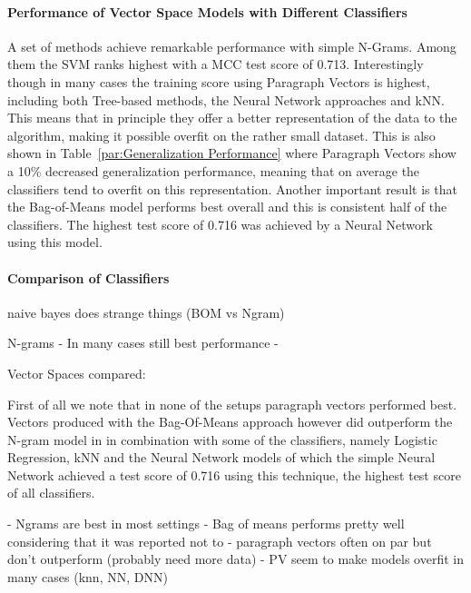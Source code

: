 \paragraph{Performance of Vector Space Models with Different Classifiers}
\label{par:Performance of Vector Space Models with Different Classifiers}

A set of methods achieve remarkable performance with simple N-Grams. Among them the SVM ranks highest with a \gls{MCC} test score of 0.713. Interestingly though in many cases the training score using Paragraph Vectors is highest, including both Tree-based methods, the Neural Network approaches and \gls{kNN}. This means that in principle they offer a better representation of the data to the algorithm, making it possible overfit on the rather small dataset. This is also shown in Table~\ref{par:Generalization Performance} where Paragraph Vectors show a 10\% decreased generalization performance, meaning that on average the classifiers tend to overfit on this representation.
Another important result is that the Bag-of-Means model performs best overall and this is consistent half of the classifiers. The highest test score of 0.716 was achieved by a Neural Network using this model.

\paragraph{Comparison of Classifiers}
\label{par:Comparison of Classifiers}




naive bayes does strange things (BOM vs Ngram)

N-grams
- In many cases still best performance
-



Vector Spaces compared:


First of all we note that in none of the setups paragraph vectors performed best. Vectors produced with the  Bag-Of-Means approach however did outperform the N-gram model in in combination with some of the classifiers, namely Logistic Regression, \gls{kNN} and the Neural Network models of which the simple Neural Network achieved a test score of 0.716 using this technique, the highest test score of all classifiers.

- Ngrams are best in most settings
- Bag of means performs pretty well considering that it was reported not to
- paragraph vectors often on par but don't outperform (probably need more data)
- PV seem to make models overfit in many cases (knn, NN, DNN)

